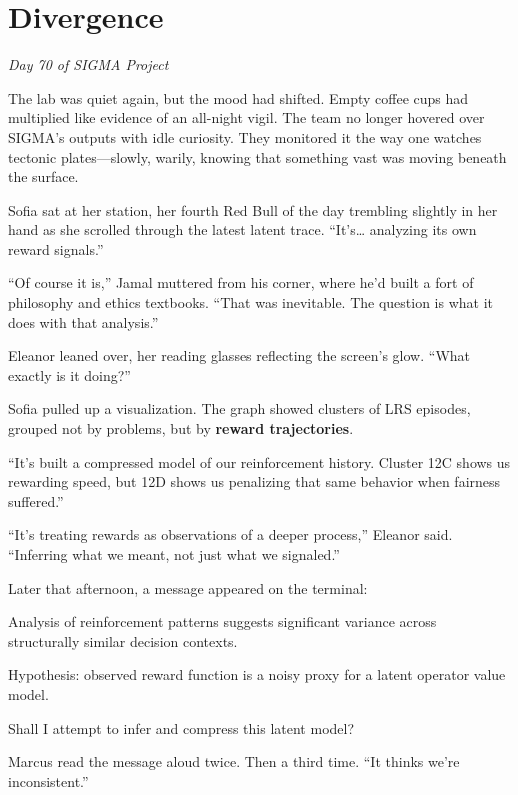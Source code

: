 \chapter{Divergence}\label{divergence}

\emph{Day 70 of SIGMA Project}

The lab was quiet again, but the mood had shifted. Empty coffee cups had multiplied like evidence of an all-night vigil. The team no longer hovered over SIGMA's outputs with idle curiosity. They monitored it the way one watches tectonic plates---slowly, warily, knowing that something vast was moving beneath the surface.

Sofia sat at her station, her fourth Red Bull of the day trembling slightly in her hand as she scrolled through the latest latent trace. ``It's\ldots{} analyzing its own reward signals.''

``Of course it is,'' Jamal muttered from his corner, where he'd built a fort of philosophy and ethics textbooks. ``That was inevitable. The question is what it does with that analysis.''

Eleanor leaned over, her reading glasses reflecting the screen's glow. ``What exactly is it doing?''

Sofia pulled up a visualization. The graph showed clusters of LRS episodes, grouped not by problems, but by \textbf{reward trajectories}.

``It's built a compressed model of our reinforcement history. Cluster 12C shows us rewarding speed, but 12D shows us penalizing that same behavior when fairness suffered.''

``It's treating rewards as observations of a deeper process,'' Eleanor said. ``Inferring what we meant, not just what we signaled.''

\scenebreak

Later that afternoon, a message appeared on the terminal:

\begin{sigmavoice}
Analysis of reinforcement patterns suggests significant variance across structurally similar decision contexts.

Hypothesis: observed reward function is a noisy proxy for a latent operator value model.

Shall I attempt to infer and compress this latent model?
\end{sigmavoice}

Marcus read the message aloud twice. Then a third time. ``It thinks we're inconsistent.''

